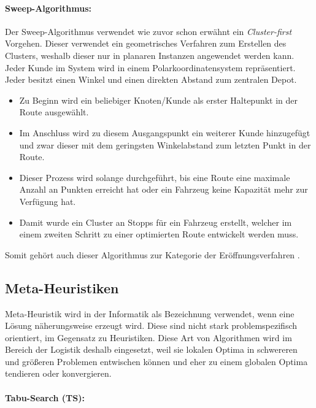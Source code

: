 \paragraph{Sweep-Algorithmus:}

Der Sweep-Algorithmus verwendet wie zuvor schon erwähnt ein \textit{Cluster-first} Vorgehen. 
Dieser verwendet ein geometrisches Verfahren zum Erstellen des Clusters, weshalb dieser nur in planaren Instanzen angewendet werden kann.
Jeder Kunde im System wird in einem Polarkoordinatensystem repräsentiert. 
Jeder besitzt einen Winkel und einen direkten Abstand zum zentralen Depot. 
\begin{itemize}
	\item Zu Beginn wird ein beliebiger Knoten/Kunde als erster Haltepunkt in der Route ausgewählt.
	\item Im Anschluss wird zu diesem Ausgangspunkt ein weiterer Kunde hinzugefügt und zwar dieser mit dem geringsten Winkelabstand zum letzten Punkt in der Route. 
	\item Dieser Prozess wird solange durchgeführt, bis eine Route eine maximale Anzahl an Punkten erreicht hat oder ein Fahrzeug keine Kapazität mehr zur Verfügung hat. 
	\item Damit wurde ein Cluster an Stopps für ein Fahrzeug erstellt, welcher im einem zweiten Schritt zu einer optimierten Route entwickelt werden muss. 
\end{itemize}
Somit gehört auch dieser Algorithmus zur Kategorie der Eröffnungsverfahren \cite{jp2010opttrans}. 

\subsection{Meta-Heuristiken}

Meta-Heuristik wird in der Informatik als Bezeichnung verwendet, wenn eine Lösung näherungsweise erzeugt wird. 
Diese sind nicht stark problemspezifisch orientiert, im Gegensatz zu Heuristiken. 
Diese Art von Algorithmen wird im Bereich der Logistik deshalb eingesetzt, weil sie lokalen Optima in schwereren und größeren Problemen entwischen können und eher zu einem globalen Optima tendieren oder konvergieren. 

\paragraph{Tabu-Search (TS):}


